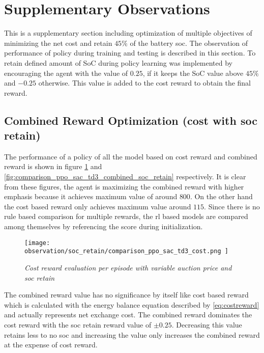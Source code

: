 \chapter*{Supplementary Observations} \label{ch-6} %
\begin{large}
\vspace*{3\baselineskip}

This is a supplementary section including optimization of multiple objectives of minimizing the net cost and retain $45\%$ of the battery soc. The observation of performance of policy during training and testing is described in this section. To retain defined amount of SoC during policy learning was implemented by encouraging the agent with the value of $0.25$, if it keeps the SoC value above $45\%$ and $-0.25$ otherwise. This value is added to the cost reward to obtain the final reward. \\

\section*{Combined Reward Optimization (cost with soc retain)}

The performance of a policy of all the model based on cost reward and combined reward is shown in figure \ref{fig:comparison_ppo_sac_td3_cost_soc_retain} and \ref{fig:comparison_ppo_sac_td3_combined_soc_retain} respectively. It is clear from these figures, the agent is maximizing the combined reward with higher emphasis because it achieves maximum value of around $800$. On the other hand the cost based reward only achieves maximum value around $115$. Since there is no rule based comparison for multiple rewards, the rl based models are compared among themselves by referencing the score during initialization. \\

\begin{figure}[h]
	\begin{center}
		\texttt{[image: observation/soc\_retain/comparison\_ppo\_sac\_td3\_cost.png ]}
		\caption{ \textit{Cost reward evaluation per episode with variable auction price and soc retain} }
		\label{fig:comparison_ppo_sac_td3_cost_soc_retain}
	\end{center}
\end{figure}

The combined reward value has no significance by itself like cost based reward which is calculated with the energy balance equation described by \ref{eq:costreward} and actually represents net exchange cost. The combined reward dominates the cost reward with the soc retain reward value of  $\pm0.25$. Decreasing this value retains less to no soc and increasing the value only increases the combined reward at the expense of cost reward. \\


\end{large}
